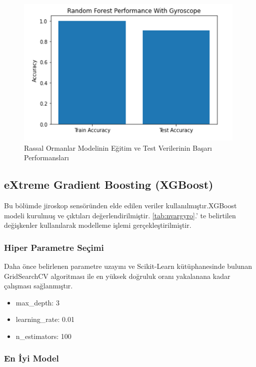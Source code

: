 \documentclass[12pt,twoside]{deuthesis}
\providecommand{\tightlist}{%
  \setlength{\itemsep}{0pt}\setlength{\parskip}{0pt}}
\begin{document}
\begin{figure}

{\centering \includegraphics[width=0.6\linewidth,height=0.25\textheight]{figure/random_forest_testtrainaccuracy} 

}

\caption{Rassal Ormanlar Modelinin Eğitim ve Test Verilerinin Başarı Performansları}\label{fig:randomforesttesttrain}
\end{figure}
\newpage

\hypertarget{extreme-gradient-boosting-xgboost}{%
\subsection{eXtreme Gradient Boosting (XGBoost)}\label{extreme-gradient-boosting-xgboost}}

Bu bölümde jiroskop sensöründen elde edilen veriler kullanılmıştır.XGBoost modeli kurulmuş ve çıktıları değerlendirilmiştir.
\ref{tab:nvargyro}.' te belirtilen değişkenler kullanılarak modelleme işlemi gerçekleştirilmiştir.

\hypertarget{hiper-parametre-seuxe7imi-2}{%
\subsubsection{Hiper Parametre Seçimi}\label{hiper-parametre-seuxe7imi-2}}

Daha önce belirlenen parametre uzayını ve Scikit-Learn kütüphanesinde bulunan GridSearchCV algoritması ile en yüksek doğruluk oranı yakalanana kadar çalışması sağlanmıştır.
\begin{itemize}
\tightlist
\item
  max\_depth: 3
\item
  learning\_rate: 0.01
\item
  n\_estimators: 100
\end{itemize}
\hypertarget{en-iyi-model-2}{%
\subsubsection{En İyi Model}\label{en-iyi-model-2}}
\end{document}
